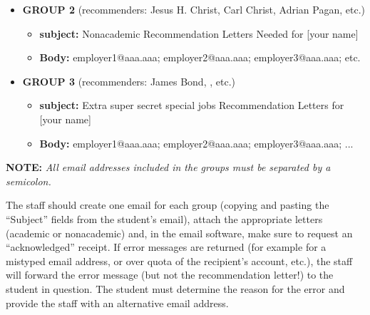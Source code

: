 \documentclass{econtex}
\begin{document}
\begin{enumerate}
\begin{itemize}
\item {\bf  GROUP 2} (recommenders: Jesus H. Christ, Carl Christ, Adrian Pagan, etc.)
\begin{itemize}
\item {\bf  subject:} Nonacademic Recommendation Letters Needed for [your name]
\item {\bf  Body:} employer1@aaa.aaa; employer2@aaa.aaa; employer3@aaa.aaa; etc.
\end{itemize}

\item {\bf  GROUP 3} (recommenders: James Bond, , etc.)
\begin{itemize}
\item {\bf  subject:} Extra super secret special jobs Recommendation Letters for [your name]
\item {\bf  Body:} employer1@aaa.aaa; employer2@aaa.aaa; employer3@aaa.aaa; ...
\end{itemize}
\end{itemize}

\textbf{NOTE:} \textit{All email addresses included in the groups must be separated by a semicolon.}

\normalsize

The staff should create one email for each group (copying and pasting
the ``Subject'' fields from the student's email), attach
the appropriate letters (academic or nonacademic) and, in the email
software, make sure to request an ``acknowledged'' receipt.  If error
messages are returned (for example for a mistyped email address, or
over quota of the recipient's account, etc.), the staff will forward
the error message (but not the recommendation letter!) to the student
in question. The student must determine the reason for the error and
provide the staff with an alternative email address.



\end{enumerate}
\end{document}
